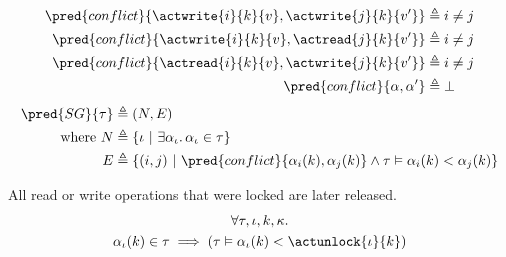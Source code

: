 \begin{align*}
\pred{conflict}{\actwrite{i}{k}{v}, \actwrite{j}{k}{v'}} &\triangleq i \neq j
\\
\pred{conflict}{\actwrite{i}{k}{v}, \actread{j}{k}{v'}} &\triangleq i \neq j
\\
\pred{conflict}{\actread{i}{k}{v}, \actwrite{j}{k}{v'}} &\triangleq i \neq j
\\
\pred{conflict}{\alpha, \alpha'} &\triangleq \bot 
\end{align*}
\begin{align*}
\pred{SG}{\tau} &\triangleq (N, E) \\
\text{where } N &\triangleq \{ \iota\ |\ \exists \alpha_\iota \ldotp \alpha_\iota \in \tau \} \\
E &\triangleq \{ (i, j)\ |\ \pred{conflict}{\alpha_i(k), \alpha_j(k)} \land \tau \vDash \alpha_i(k) < \alpha_j(k) \}
\end{align*}

\lem \label{lem:unlock} All read or write operations that were locked are later released.
\begin{gather*}
\forall \tau, \iota, k, \kappa \ldotp \\
\alpha_\iota(k) \in \tau \implies \left( \tau \vDash \alpha_\iota(k) < \actunlock{\iota}{k} \right)
\end{gather*}

